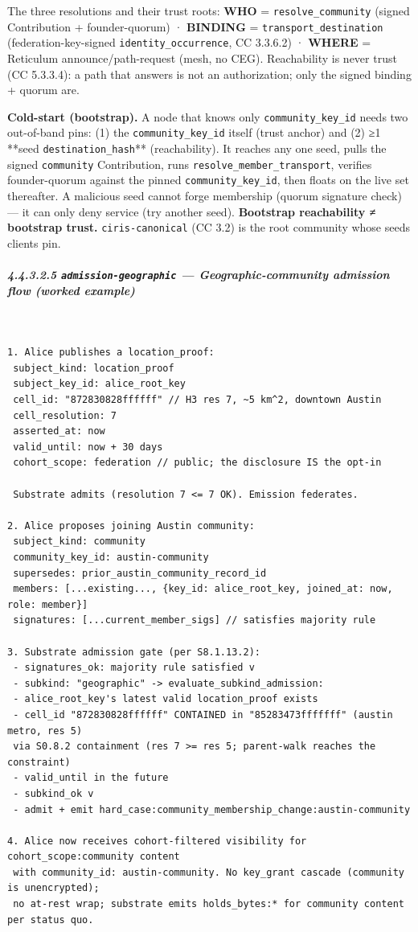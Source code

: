 \documentclass[11pt]{article}
\begin{document}
The three resolutions and their trust roots: \textbf{WHO} = \texttt{resolve\_community} (signed Contribution + founder-quorum) · \textbf{BINDING} = \texttt{transport\_destination} (federation-key-signed \texttt{identity\_occurrence}, CC 3.3.6.2) · \textbf{WHERE} = Reticulum announce/path-request (mesh, no CEG). Reachability is never trust (CC 5.3.3.4): a path that answers is not an authorization; only the signed binding + quorum are.


\textbf{Cold-start (bootstrap).} A node that knows only \texttt{community\_key\_id} needs two out-of-band pins: (1) the \texttt{community\_key\_id} itself (trust anchor) and (2) ≥1 **seed \texttt{destination\_hash}** (reachability). It reaches any one seed, pulls the signed \texttt{community} Contribution, runs \texttt{resolve\_member\_transport}, verifies founder-quorum against the pinned \texttt{community\_key\_id}, then floats on the live set thereafter. A malicious seed cannot forge membership (quorum signature check) — it can only deny service (try another seed). \textbf{Bootstrap reachability ≠ bootstrap trust.} \texttt{ciris-canonical} (CC 3.2) is the root community whose seeds clients pin.


\subparagraph{4.4.3.2.5 \texttt{admission-geographic} — Geographic-community admission flow (worked example)}\mbox{}\\


\begin{lstlisting}
1. Alice publishes a location_proof:
 subject_kind: location_proof
 subject_key_id: alice_root_key
 cell_id: "872830828ffffff" // H3 res 7, ~5 km^2, downtown Austin
 cell_resolution: 7
 asserted_at: now
 valid_until: now + 30 days
 cohort_scope: federation // public; the disclosure IS the opt-in

 Substrate admits (resolution 7 <= 7 OK). Emission federates.

2. Alice proposes joining Austin community:
 subject_kind: community
 community_key_id: austin-community
 supersedes: prior_austin_community_record_id
 members: [...existing..., {key_id: alice_root_key, joined_at: now, role: member}]
 signatures: [...current_member_sigs] // satisfies majority rule

3. Substrate admission gate (per S8.1.13.2):
 - signatures_ok: majority rule satisfied v
 - subkind: "geographic" -> evaluate_subkind_admission:
 - alice_root_key's latest valid location_proof exists
 - cell_id "872830828ffffff" CONTAINED in "85283473fffffff" (austin metro, res 5)
 via S0.8.2 containment (res 7 >= res 5; parent-walk reaches the constraint)
 - valid_until in the future
 - subkind_ok v
 - admit + emit hard_case:community_membership_change:austin-community

4. Alice now receives cohort-filtered visibility for cohort_scope:community content
 with community_id: austin-community. No key_grant cascade (community is unencrypted);
 no at-rest wrap; substrate emits holds_bytes:* for community content per status quo.
\end{lstlisting}
\end{document}
